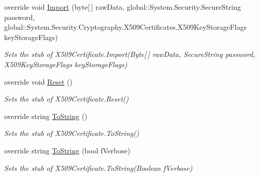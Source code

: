 \begin{DoxyCompactItemize}
override void \hyperlink{class_system_1_1_security_1_1_cryptography_1_1_x509_certificates_1_1_fakes_1_1_stub_x509_certificate_aacdb5fafe31ba3787a337d14f9725a82}{Import} (byte\mbox{[}$\,$\mbox{]} raw\-Data, global\-::\-System.\-Security.\-Secure\-String password, global\-::\-System.\-Security.\-Cryptography.\-X509\-Certificates.\-X509\-Key\-Storage\-Flags key\-Storage\-Flags)
\begin{DoxyCompactList}\small\item\em Sets the stub of X509\-Certificate.\-Import(\-Byte\mbox{[}$\,$\mbox{]} raw\-Data, Secure\-String password, X509\-Key\-Storage\-Flags key\-Storage\-Flags)\end{DoxyCompactList}\item 
override void \hyperlink{class_system_1_1_security_1_1_cryptography_1_1_x509_certificates_1_1_fakes_1_1_stub_x509_certificate_a2bd8948563242ef5a22bb3eae7f65b65}{Reset} ()
\begin{DoxyCompactList}\small\item\em Sets the stub of X509\-Certificate.\-Reset()\end{DoxyCompactList}\item 
override string \hyperlink{class_system_1_1_security_1_1_cryptography_1_1_x509_certificates_1_1_fakes_1_1_stub_x509_certificate_a968b5503e9198b2b5d2269b55f749638}{To\-String} ()
\begin{DoxyCompactList}\small\item\em Sets the stub of X509\-Certificate.\-To\-String()\end{DoxyCompactList}\item 
override string \hyperlink{class_system_1_1_security_1_1_cryptography_1_1_x509_certificates_1_1_fakes_1_1_stub_x509_certificate_a1324f6aa1c83abbe43e5172d6ea345ca}{To\-String} (bool f\-Verbose)
\begin{DoxyCompactList}\small\item\em Sets the stub of X509\-Certificate.\-To\-String(\-Boolean f\-Verbose)\end{DoxyCompactList}\end{DoxyCompactItemize}
